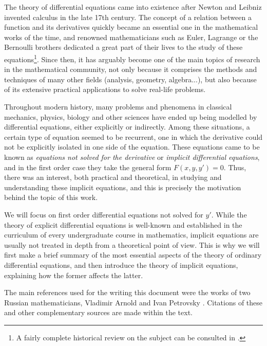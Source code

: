 %
%
%

The theory of differential equations came into existence after Newton and Leibniz invented calculus in the late 17th century. The concept of a relation between a function and its derivatives quickly became an essential one in the mathematical works of the time, and renowned mathematicians such as Euler, Lagrange or the Bernoulli brothers dedicated a great part of their lives to the study of these equations\footnote{A fairly complete historical review on the subject can be consulted in \cite{archibald2004history}.}. Since then, it has arguably become one of the main topics of research in the mathematical community, not only because it comprises the methods and techniques of many other fields (analysis, geometry, algebra...), but also because of its extensive practical applications to solve real-life problems.

Throughout modern history, many problems and phenomena in classical mechanics, physics, biology and other sciences have ended up being modelled by differential equations, either explicitly or indirectly. Among these situations, a certain type of equation seemed to be recurrent, one in which the derivative could not be explicitly isolated in one side of the equation. These equations came to be known as \textit{equations not solved for the derivative} or \textit{implicit differential equations}, and in the first order case they take the general form $F(x,y,y')=0$. Thus, there was an interest, both practical and theoretical, in studying and understanding these implicit equations, and this is precisely the motivation behind the topic of this work.

We will focus on first order differential equations not solved for $y'$. While the theory of explicit differential equations is well-known and established in the curriculum of every undergraduate course in mathematics, implicit equations are usually not treated in depth from a theoretical point of view. This is why we will first make a brief summary of the most essential aspects of the theory of ordinary differential equations, and then introduce the theory of implicit equations, explaining how the former affects the latter.

The main references used for the writing this document were the works of two Russian mathematicians, Vladimir Arnold \cite{arnold2012geometrical, cooke1992ordinary} and Ivan Petrovsky \cite{petrovski1966ordinary}. Citations of these and other complementary sources are made within the text.

